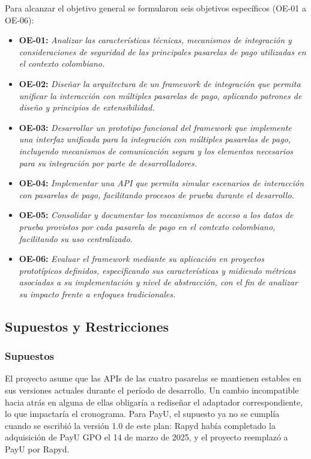 Para alcanzar el objetivo general se formularon seis objetivos específicos (OE-01 a OE-06):

\begin{itemize}
  \item \textbf{OE-01:} \textit{Analizar las características técnicas, mecanismos de integración y consideraciones de seguridad de las principales pasarelas de pago utilizadas en el contexto colombiano.}
  \item \textbf{OE-02:} \textit{Diseñar la arquitectura de un framework de integración que permita unificar la interacción con múltiples pasarelas de pago, aplicando patrones de diseño y principios de extensibilidad.}
  \item \textbf{OE-03:} \textit{Desarrollar un prototipo funcional del framework que implemente una interfaz unificada para la integración con múltiples pasarelas de pago, incluyendo mecanismos de comunicación segura y los elementos necesarios para su integración por parte de desarrolladores.}
  \item \textbf{OE-04:} \textit{Implementar una API que permita simular escenarios de interacción con pasarelas de pago, facilitando procesos de prueba durante el desarrollo.}
  \item \textbf{OE-05:} \textit{Consolidar y documentar los mecanismos de acceso a los datos de prueba provistos por cada pasarela de pago en el contexto colombiano, facilitando su uso centralizado.}
  \item \textbf{OE-06:} \textit{Evaluar el framework mediante su aplicación en proyectos prototípicos definidos, especificando sus características y midiendo métricas asociadas a su implementación y nivel de abstracción, con el fin de analizar su impacto frente a enfoques tradicionales.}
\end{itemize}

\subsection{Supuestos y Restricciones}

\subsubsection{Supuestos}

El proyecto asume que las APIs de las cuatro pasarelas se mantienen estables en sus versiones actuales durante el período de desarrollo. Un cambio incompatible hacia atrás en alguna de ellas obligaría a rediseñar el adaptador correspondiente, lo que impactaría el cronograma. Para PayU, el supuesto ya no se cumplía cuando se escribió la versión 1.0 de este plan: Rapyd había completado la adquisición de PayU GPO el 14 de marzo de 2025, y el proyecto reemplazó a PayU por Rapyd.

